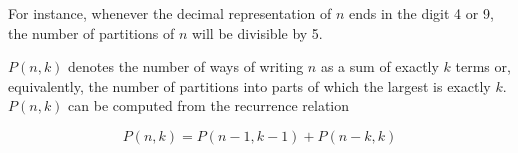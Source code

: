 For instance, whenever the decimal representation of $n$ ends in the digit 4 or 9, the number of partitions of $n$ will be divisible by 5.

$P(n,k)$ denotes the number of ways of writing $n$ as a sum of exactly $k$ terms or, equivalently, the number of partitions into parts of which the largest is exactly $k$. $P(n,k)$ can be computed from the recurrence relation

\begin{equation}
  P(n,k)=P(n-1,k-1)+P(n-k,k)
\end{equation}
